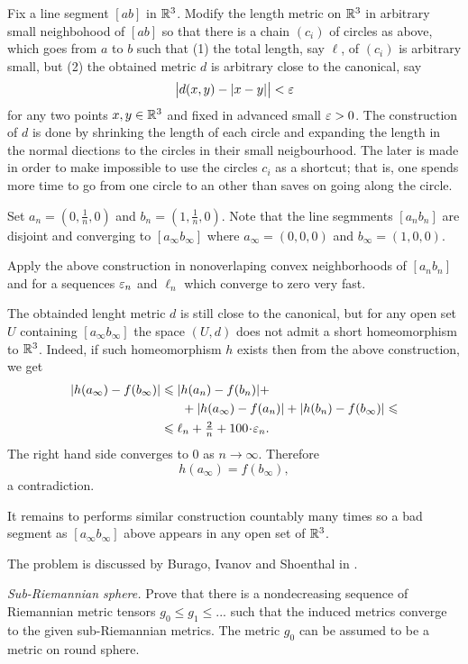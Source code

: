 Fix a line segment $[ab]$ in $\mathbb{R}^3$.
Modify 
the length metric on $\mathbb{R}^3$ in arbitrary small neighbohood of $[ab]$
so that there is a chain $(c_i)$ of circles as above,
which goes from $a$ to $b$ 
such that
(1) the total length, say $\ell$, 
of $(c_i)$ is arbitrary small,
but 
(2) the obtained metric $d$ 
is arbitrary close to the canonical, say
\[\bigl|d(x,y)-|x-y|\bigr|<\varepsilon\]
for any two points $x,y\in\mathbb{R}^3$
and fixed in advanced small $\varepsilon>0$.
The construction of $d$ 
is done by shrinking the length of each circle
and expanding the length in the normal diections  
to the circles in their small neigbourhood.
The later is made in order to make impossible to use the circles $c_i$ as a shortcut;
that is, one spends more time to go from one circle to an other 
than saves on going along the circle.

Set $a_n=(0,\tfrac1n,0)$ and $b_n=(1,\tfrac1n,0)$.
Note that the line segmments $[a_nb_n]$ are disjoint and converging
to $[a_\infty b_\infty]$
where $a_\infty=(0,0,0)$ and $b_\infty=(1,0,0)$.

Apply the above construction in nonoverlaping convex neighborhoods of $[a_nb_n]$ 
and for a sequences 
$\varepsilon_n$ and $\ell_n$ 
which converge to zero very fast.

The obtainded lenght metric $d$ is still close to the canonical,
but for any open set $U$ containing $[a_\infty b_\infty]$
the space $(U,d)$ does not admit 
a short homeomorphism to $\mathbb{R}^3$.
Indeed, if such homeomorphism $h$
exists then 
from the above construction,
we get 
\begin{align*}
|h(a_\infty)-f(b_\infty)|
&\le 
|h(a_n)-f(b_n)|
+
\\
&\ \ \ \ \ +
|h(a_\infty)-f(a_n)|
+
|h(b_n)-f(b_\infty)|
\le
\\
&\le
\ell_n+\tfrac2n+100\cdot\eps_n.
\end{align*}
The right hand side converges to $0$ as $n\to\infty$.
Therefore 
\[h(a_\infty)=f(b_\infty),\] 
a contradiction.

It remains to performs similar construction countably many times so a bad segment as $[a_\infty b_\infty]$ above
appears in any open set of $\mathbb{R}^3$.


The problem is discussed 
by Burago, Ivanov and Shoenthal 
in \cite{BIS}.

\textit{Sub-Riemannian sphere.}
Prove that there is a nondecreasing sequence of Riemannian metric tensors
$g_0\le g_1\le ...$ such that the induced metrics converge to the given sub-Riemannian metrics.
The metric $g_0$ can be assumed to be a metric on round sphere.

